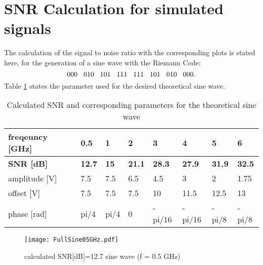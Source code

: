 \section{SNR Calculation for simulated signals}
\label{app:snr}
The calculation of the signal to noise ratio with the corresponding plots is stated here, for the generation of a sine wave with the Riemann Code:
\begin{equation}
000\hspace{.3cm} 010\hspace{.3cm} 101\hspace{.3cm} 111\hspace{.3cm} 111\hspace{.3cm} 101\hspace{.3cm} 010\hspace{.3cm} 000.
\end{equation}
Table \ref{tab:snr} states the parameter used for the desired theoretical sine wave.


\begin{table}[h]
\centering
\caption{Calculated SNR and corresponding parameters for the theoretical sine wave}
\label{tab:snr}
\begin{tabular}{|l|l|l|l|l|l|l|l|}
\hline
freqeuncy {[}GHz{]}   & 0.5           & 1           & 2             & 3             & 4             & 5             & 6             \\ \hline
\textbf{SNR {[}dB{]}} & \textbf{12.7} & \textbf{15} & \textbf{21.1} & \textbf{28.3} & \textbf{27.9} & \textbf{31.9} & \textbf{32.5} \\ \hline
amplitude {[}V{]}     & 7.5           & 7.5         & 6.5           & 4.5           & 3             & 2             & 1.75          \\ \hline
offset {[}V{]}        & 7.5           & 7.5         & 7.5           & 10            & 11.5          & 12.5          & 13            \\ \hline
phase {[}rad{]}       & pi/4          & pi/4        & 0             & -pi/16        & -pi/16        & -pi/8         & -pi/8         \\ \hline
\end{tabular}
\end{table}


\begin{figure}[h]
   \centering
   \texttt{[image: FullSine05GHz.pdf]}
   \caption{calculated SNR[dB]=12.7 sine wave (f = 0.5 GHz)}
   \label{fig:snr05GHz}
\end{figure}

